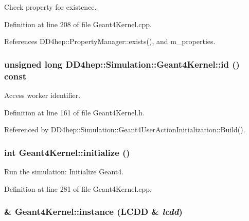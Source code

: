Check property for existence. 

Definition at line 208 of file Geant4Kernel.cpp.

References DD4hep::PropertyManager::exists(), and m\_\-properties.\hypertarget{class_d_d4hep_1_1_simulation_1_1_geant4_kernel_ac15d27b4d51308d7eeab4c18702513d1}{
\subsubsection[{id}]{\setlength{\rightskip}{0pt plus 5cm}unsigned long DD4hep::Simulation::Geant4Kernel::id () const}}
\label{class_d_d4hep_1_1_simulation_1_1_geant4_kernel_ac15d27b4d51308d7eeab4c18702513d1}


Access worker identifier. 

Definition at line 161 of file Geant4Kernel.h.

Referenced by DD4hep::Simulation::Geant4UserActionInitialization::Build().\hypertarget{class_d_d4hep_1_1_simulation_1_1_geant4_kernel_add7a520dbd9824819e75cf9ea3725882}{
\subsubsection[{initialize}]{\setlength{\rightskip}{0pt plus 5cm}int Geant4Kernel::initialize ()}}
\label{class_d_d4hep_1_1_simulation_1_1_geant4_kernel_add7a520dbd9824819e75cf9ea3725882}


Run the simulation: Initialize Geant4. 

Definition at line 281 of file Geant4Kernel.cpp.\hypertarget{class_d_d4hep_1_1_simulation_1_1_geant4_kernel_a791f6c4b8f9257f98d453457655870de}{
\subsubsection[{instance}]{ \& Geant4Kernel::instance ({\bf LCDD} \& {\em lcdd})}}
\label{class_d_d4hep_1_1_simulation_1_1_geant4_kernel_a791f6c4b8f9257f98d453457655870de}


